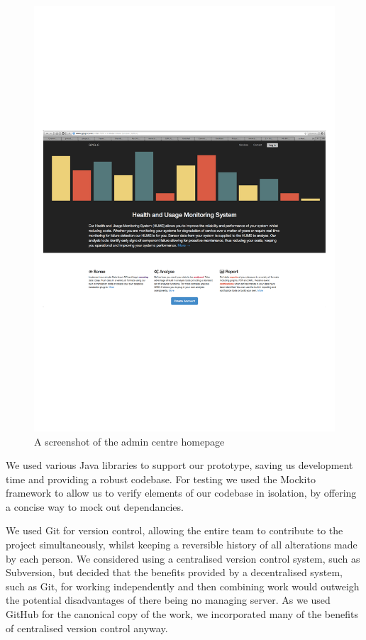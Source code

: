 \documentclass[10pt,a4paper]{article}
\begin{document}
\begin{figure}[htbp!]
  \centering
  \includegraphics[width=15cm]{images/admin.pdf}
  \caption{A screenshot of the admin centre homepage}
  \label{fig:admin}
\end{figure}

We used various Java libraries to support our prototype, saving us 
development time and providing a robust codebase. For testing we used 
the Mockito framework to allow us to verify elements of our codebase in 
isolation, by offering a concise way to mock out dependancies.

We used Git for version control, allowing the entire team to
contribute to the project simultaneously, whilst keeping a reversible
history of all alterations made by each person. We considered using a
centralised version control system, such as Subversion, but decided that the
benefits provided by a decentralised system, such as Git, for working
independently and then combining work would outweigh the potential
disadvantages of there being no managing server. As we used GitHub for the
canonical copy of the work, we incorporated many of the benefits of centralised
version control anyway.
\end{document}
